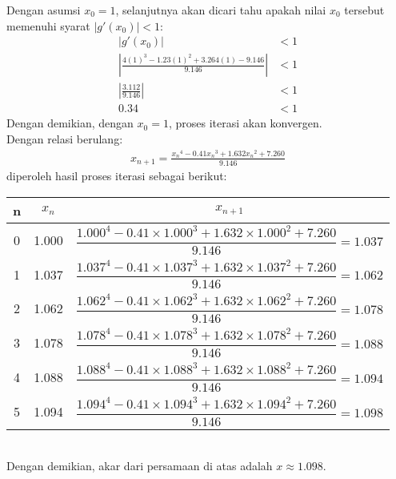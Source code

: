 \documentclass{article}
\begin{document}
\begin{enumerate}
\begin{enumerate}
        Dengan asumsi $x_0 = 1$, selanjutnya akan dicari tahu apakah nilai $x_0$ tersebut memenuhi syarat $|g'(x_0)| < 1$:
        \begin{align*}
            \left|g'(x_0)\right| &< 1 \\
            \left|\frac{4(1)^3 - \num{1,23}(1)^2 + \num{3,264}(1) - \num{9,146}}{\num{9,146}}\right| &< 1 \\
            \left|\frac{\num{3,112}}{\num{9,146}}\right| &< 1 \\
            \num{0,34} &< 1
        \end{align*}
        Dengan demikian, dengan $x_0 = 1$, proses iterasi akan konvergen. \\
    
        Dengan relasi berulang:
        \begin{align*}
            x_{n+1} = \frac{{x_n}^4 - \num{0,41}{x_n}^3 + \num{1,632}{x_n}^2 + \num{7,260}}{\num{9,146}}
        \end{align*}
        diperoleh hasil proses iterasi sebagai berikut: \\
        \begin{tabular}{|c|c|c|}
            \hline
            n & $x_n$ & $x_{n+1}$ \\
            \hline
            0 & \num{1,000} & $\dfrac{\num{1,000}^4 - \num{0,41} \times \num{1,000}^3 + \num{1,632} \times \num{1,000}^2 + \num{7,260}}{\num{9,146}} = \num{1,037}$ \\
            1 & \num{1,037} & $\dfrac{\num{1,037}^4 - \num{0,41} \times \num{1,037}^3 + \num{1,632} \times \num{1,037}^2 + \num{7,260}}{\num{9,146}} = \num{1,062}$ \\
            2 & \num{1,062} & $\dfrac{\num{1,062}^4 - \num{0,41} \times \num{1,062}^3 + \num{1,632} \times \num{1,062}^2 + \num{7,260}}{\num{9,146}} = \num{1,078}$ \\
            3 & \num{1,078} & $\dfrac{\num{1,078}^4 - \num{0,41} \times \num{1,078}^3 + \num{1,632} \times \num{1,078}^2 + \num{7,260}}{\num{9,146}} = \num{1,088}$ \\
            4 & \num{1,088} & $\dfrac{\num{1,088}^4 - \num{0,41} \times \num{1,088}^3 + \num{1,632} \times \num{1,088}^2 + \num{7,260}}{\num{9,146}} = \num{1,094}$ \\
            5 & \num{1,094} & $\dfrac{\num{1,094}^4 - \num{0,41} \times \num{1,094}^3 + \num{1,632} \times \num{1,094}^2 + \num{7,260}}{\num{9,146}} = \num{1,098}$ \\
            \hline
        \end{tabular} \\
        Dengan demikian, akar dari persamaan di atas adalah $x \approx \num{1,098}$.
    \end{enumerate}


\end{enumerate}
\end{document}
